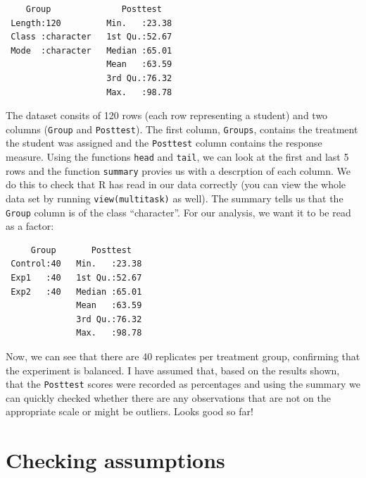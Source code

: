 \documentclass[
  letterpaper,
  DIV=11,
  numbers=noendperiod,
  oneside]{scrreprt}
\newenvironment{Shaded}{\begin{snugshade}}{\end{snugshade}}
\newcommand{\FunctionTok}[1]{\textcolor[rgb]{0.28,0.35,0.67}{#1}}
\newcommand{\NormalTok}[1]{\textcolor[rgb]{0.00,0.23,0.31}{#1}}
\newcommand{\OtherTok}[1]{\textcolor[rgb]{0.00,0.23,0.31}{#1}}
\newcommand{\SpecialCharTok}[1]{\textcolor[rgb]{0.37,0.37,0.37}{#1}}
\begin{document}
\begin{verbatim}
    Group              Posttest    
 Length:120         Min.   :23.38  
 Class :character   1st Qu.:52.67  
 Mode  :character   Median :65.01  
                    Mean   :63.59  
                    3rd Qu.:76.32  
                    Max.   :98.78  
\end{verbatim}

The dataset consits of 120 rows (each row representing a student) and
two columns (\texttt{Group} and \texttt{Posttest}). The first column,
\texttt{Groups}, contains the treatment the student was assigned and the
\texttt{Posttest} column contains the response measure. Using the
functions \texttt{head} and \texttt{tail}, we can look at the first and
last 5 rows and the function \texttt{summary} provies us with a
descrption of each column. We do this to check that R has read in our
data correctly (you can view the whole data set by running
\texttt{view(multitask)} as well). The summary tells us that the
\texttt{Group} column is of the class ``character''. For our analysis,
we want it to be read as a factor:

\begin{Shaded}
\end{Shaded}

\begin{verbatim}
     Group       Posttest    
 Control:40   Min.   :23.38  
 Exp1   :40   1st Qu.:52.67  
 Exp2   :40   Median :65.01  
              Mean   :63.59  
              3rd Qu.:76.32  
              Max.   :98.78  
\end{verbatim}

Now, we can see that there are 40 replicates per treatment group,
confirming that the experiment is balanced. I have assumed that, based
on the results shown, that the \texttt{Posttest} scores were recorded as
percentages and using the summary we can quickly checked whether there
are any observations that are not on the appropriate scale or might be
outliers. Looks good so far!

\section{Checking assumptions}\label{checking-assumptions}
\end{document}

